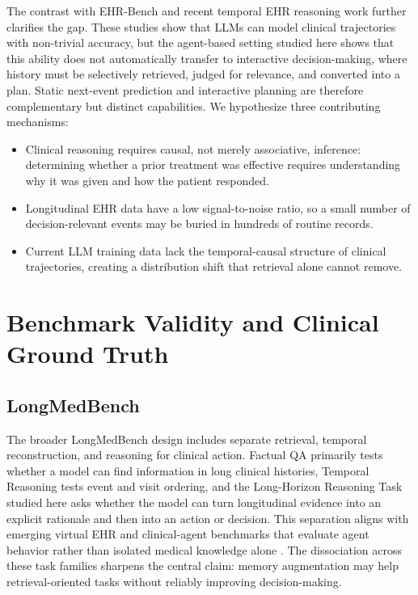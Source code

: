 The contrast with EHR-Bench \cite{2025_ehr_r1} and recent temporal EHR reasoning work \cite{2025_timer,qu2026tracetemporalreasoningagentic} further clarifies the gap. These studies show that LLMs can model clinical trajectories with non-trivial accuracy, but the agent-based setting studied here shows that this ability does not automatically transfer to interactive decision-making, where history must be selectively retrieved, judged for relevance, and converted into a plan. Static next-event prediction and interactive planning are therefore complementary but distinct capabilities. We hypothesize three contributing mechanisms:
\begin{itemize}
    \item Clinical reasoning requires causal, not merely associative, inference: determining whether a prior treatment was effective requires understanding why it was given and how the patient responded.
    \item Longitudinal EHR data have a low signal-to-noise ratio, so a small number of decision-relevant events may be buried in hundreds of routine records.
    \item Current LLM training data lack the temporal-causal structure of clinical trajectories, creating a distribution shift that retrieval alone cannot remove.
\end{itemize}

\section{Benchmark Validity and Clinical Ground Truth}

\subsection{LongMedBench}
The broader LongMedBench design includes separate retrieval, temporal reconstruction, and reasoning for clinical action. Factual QA primarily tests whether a model can find information in long clinical histories, Temporal Reasoning tests event and visit ordering, and the Long-Horizon Reasoning Task studied here asks whether the model can turn longitudinal evidence into an explicit rationale and then into an action or decision. This separation aligns with emerging virtual EHR and clinical-agent benchmarks that evaluate agent behavior rather than isolated medical knowledge alone \cite{jiang2025medagentbench,liao2026agentehr}. The dissociation across these task families sharpens the central claim: memory augmentation may help retrieval-oriented tasks without reliably improving decision-making.

